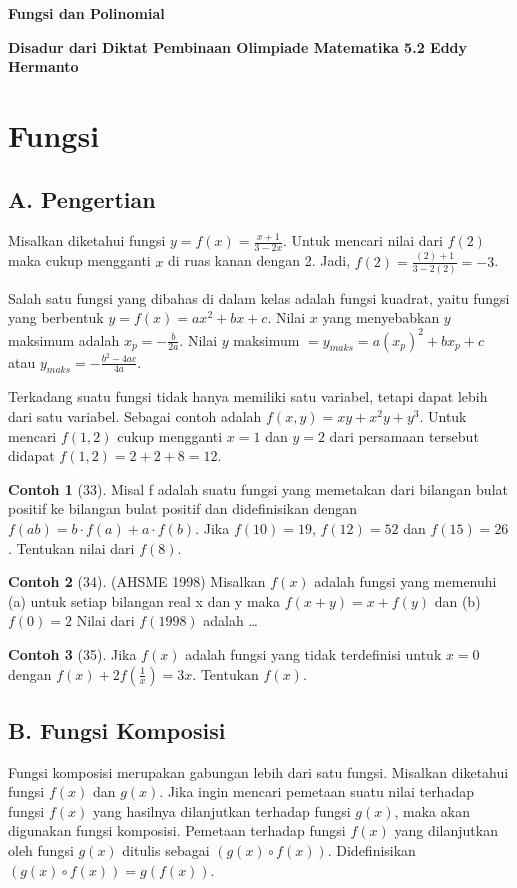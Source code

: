 \documentclass[12pt]{scrartcl}
\theoremstyle{definition}
\newtheorem{contoh}{Contoh}
\begin{document}
\renewcommand*\contentsname{Daftar Isi}
\tableofcontents

\newpage
\textbf{\Huge Fungsi dan Polinomial}

\textbf{Disadur dari Diktat Pembinaan Olimpiade Matematika 5.2 Eddy Hermanto}

\section*{Fungsi}

\subsection*{A. Pengertian}
Misalkan diketahui fungsi $y = f(x) = \frac{x+1}{3-2x}$.
Untuk mencari nilai dari $f(2)$ maka cukup mengganti $x$ di ruas kanan dengan 2.
Jadi, $f(2) = \frac{(2)+1}{3-2(2)} = -3$.

Salah satu fungsi yang dibahas di dalam kelas adalah fungsi kuadrat, yaitu fungsi yang berbentuk $y = f(x) = ax^2+bx+c$.
Nilai $x$ yang menyebabkan $y$ maksimum adalah $x_p = -\frac{b}{2a}$.
Nilai $y$ maksimum $= y_{maks} = a(x_p)^2 + bx_p + c$ atau $y_{maks} = -\frac{b^2-4ac}{4a}$.

Terkadang suatu fungsi tidak hanya memiliki satu variabel, tetapi dapat lebih dari satu variabel. Sebagai contoh adalah $f(x,y) = xy + x^2y + y^3$. Untuk mencari $f(1,2)$ cukup mengganti $x=1$ dan $y=2$ dari persamaan tersebut didapat $f(1,2) = 2+2+8=12$.

\begin{contoh}[33]
Misal f adalah suatu fungsi yang memetakan dari bilangan bulat positif ke bilangan bulat positif dan didefinisikan dengan $f(ab) = b \cdot f(a) + a \cdot f(b)$. Jika $f(10) = 19$, $f(12) = 52$ dan $f(15) = 26$. Tentukan nilai dari $f(8)$.
\end{contoh}

\begin{contoh}[34]
(AHSME 1998) Misalkan $f(x)$ adalah fungsi yang memenuhi
(a) untuk setiap bilangan real x dan y maka $f(x+y) = x + f(y)$ dan
(b) $f(0) = 2$
Nilai dari $f(1998)$ adalah \dots
\end{contoh}

\begin{contoh}[35]
Jika $f(x)$ adalah fungsi yang tidak terdefinisi untuk $x=0$ dengan $f(x) + 2f(\frac{1}{x}) = 3x$. Tentukan $f(x)$.
\end{contoh}

\subsection*{B. Fungsi Komposisi}
Fungsi komposisi merupakan gabungan lebih dari satu fungsi. 
Misalkan diketahui fungsi $f(x)$ dan $g(x)$. Jika ingin mencari pemetaan suatu nilai terhadap fungsi $f(x)$ yang hasilnya dilanjutkan terhadap fungsi $g(x)$, maka akan digunakan fungsi komposisi. 
Pemetaan terhadap fungsi $f(x)$ yang dilanjutkan oleh fungsi $g(x)$ ditulis sebagai $(g(x) \circ f(x))$. 
Didefinisikan $(g(x) \circ f(x)) = g(f(x))$. 
\end{document}

